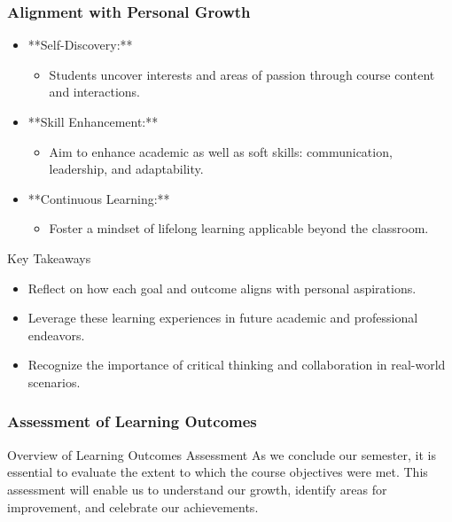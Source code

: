 \documentclass[aspectratio=169]{beamer}
\begin{document}
\begin{frame}[fragile]
    \frametitle{Alignment with Personal Growth}
    \begin{itemize}
        \item **Self-Discovery:**
        \begin{itemize}
            \item Students uncover interests and areas of passion through course content and interactions.
        \end{itemize}

        \item **Skill Enhancement:**
        \begin{itemize}
            \item Aim to enhance academic as well as soft skills: communication, leadership, and adaptability.
        \end{itemize}

        \item **Continuous Learning:**
        \begin{itemize}
            \item Foster a mindset of lifelong learning applicable beyond the classroom.
        \end{itemize}
    \end{itemize}

    \begin{block}{Key Takeaways}
        \begin{itemize}
            \item Reflect on how each goal and outcome aligns with personal aspirations.
            \item Leverage these learning experiences in future academic and professional endeavors.
            \item Recognize the importance of critical thinking and collaboration in real-world scenarios.
        \end{itemize}
    \end{block}
\end{frame}

\begin{frame}[fragile]
  \frametitle{Assessment of Learning Outcomes}
  \begin{block}{Overview of Learning Outcomes Assessment}
    As we conclude our semester, it is essential to evaluate the extent to which the course objectives were met. This assessment will enable us to understand our growth, identify areas for improvement, and celebrate our achievements.
  \end{block}
\end{frame}
\end{document}
